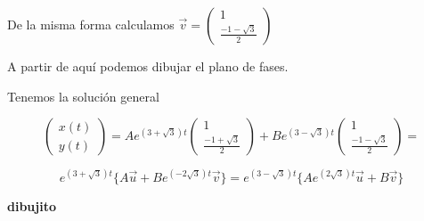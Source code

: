 \begin{example}
De la misma forma calculamos $\vec{v} = \begin{pmatrix}
1\\\frac{-1-\sqrt{3}}{2}
\end{pmatrix}$

A partir de aquí podemos dibujar el plano de fases.

Tenemos la solución general

$$\begin{pmatrix}
x(t)\\y(t)
\end{pmatrix} = Ae^{(3+\sqrt{3})t}\begin{pmatrix}
1\\\frac{-1+\sqrt{3}}{2}
\end{pmatrix}+Be^{(3-\sqrt{3})t}\begin{pmatrix}
1\\\frac{-1-\sqrt{3}}{2}
\end{pmatrix} = $$

$$e^{(3+\sqrt{3})t}\{ A\vec{u} + Be^{(-2\sqrt{3})t}\vec{v} \} = e^{(3-\sqrt{3})t}\{ Ae^{(2\sqrt{3})t}\vec{u} +B\vec{v} \}$$

\textbf{dibujito}
\end{example}

